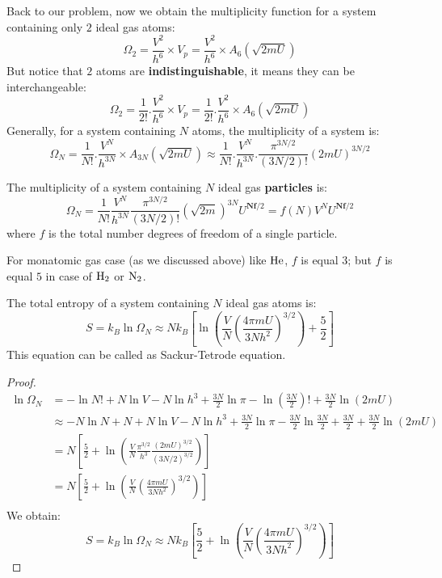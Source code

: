 \documentclass[~/PhyAI/phyai.tex]{subfiles}
\begin{document}
Back to our problem, now we obtain the multiplicity function for a system containing only $2$ ideal gas atoms:
$$ \Omega_{2}=\frac{V^{2} }{h^{6}}\times V_{p}=\frac{V^{2} }{h^{6}}\times A_{6}(\sqrt{2mU}) $$
But notice that $2$ atoms are \textbf{indistinguishable}, it means they can be interchangeable:
$$ \Omega_{2}=\frac{1 }{2!}.\frac{V^{2} }{h^{6}}\times V_{p}=\frac{1 }{2!}.\frac{V^{2} }{h^{6}}\times A_{6}(\sqrt{2mU})$$
Generally, for a system containing $N$ atoms, the multiplicity of a system is:
$$ \Omega_{N}=\frac{1}{N!}.\frac{V^{N}}{h^{3N}}\times A_{3N}(\sqrt{2mU})\approx\frac{1 }{N!}.\frac{V^{N}}{h^{3N}}.\frac{\pi^{3N/2}}{(3N/2)!}(2mU)^{3N/2} $$
\begin{theorem}
	\label{The Multiplicity of Ideal Gas}
	The multiplicity of a system containing $N$ ideal gas \textbf{particles} is:
	$$ \Omega_{N}=\frac{1 }{N!}\frac{V^{N }}{h^{3N}}\frac{\pi^{3N/2}}{(3N/2)!}(\sqrt{2m})^{3N}U^{\textbf{Nf}/2}=f(N)V^{N}U^{\textbf{Nf}/2} $$
	where $f$ is the total number degrees of freedom of a single particle.
\end{theorem}
For monatomic gas case (as we discussed above) like $\ce{He}$, $f$ is equal $3$; but $f$ is equal $5$ in case of $\ce{H2}$ or $\ce{N2}$.
\begin{theorem} The total entropy of a system containing $N$ ideal gas atoms is:
	\label{The Entropy of Ideal Gas}
	$$ S=k_{B}\ln\Omega_{N}\approx Nk_{B} \left[\ln \left(\frac{V}{N} \left(\frac{4 \pi mU}{3Nh^{2}}\right)^{3/2}\right)+\frac{5}{2}\right] $$
	This equation can be called as Sackur-Tetrode equation.
\end{theorem}
\begin{proof}
	\begin{equation*}
		\begin{split}
			\ln \Omega_{N}&=-\ln{N!}+N\ln{V}-N\ln{h^3}+\frac{3N }{2}\ln\pi -\ln \left(\frac{3N}{2}\right)!+\frac{3N }{2}\ln{(2mU)}\\
			&\approx -N\ln{N}+N+N\ln{V}-N\ln{h^3}+\frac{3N }{2}\ln\pi -\frac{3N }{2}\ln \frac{3N }{2}+\frac{3N }{2}+\frac{3N }{2}\ln{(2mU)}\\
			&=N \left[\frac{5}{2}+\ln \left(\frac{V}{N}\frac{\pi^{3/2}}{h^{3}}\frac{(2mU)^{3/2}}{(3N/2)^{3/2}}\right)\right]\\
			&=N \left[\frac{5}{2}+\ln \left(\frac{V}{N} \left(\frac{4\pi mU}{3Nh^{2}}\right)^{3/2}\right)\right]\\
		\end{split}
	\end{equation*}
	We obtain:
	$$ S=k_{B}\ln{\Omega_{N}}\approx Nk_{B}\left[\frac{5}{2}+\ln \left(\frac{V}{N} \left(\frac{4\pi mU}{3Nh^{2}}\right)^{3/2}\right)\right] $$
\end{proof}
\end{document}
